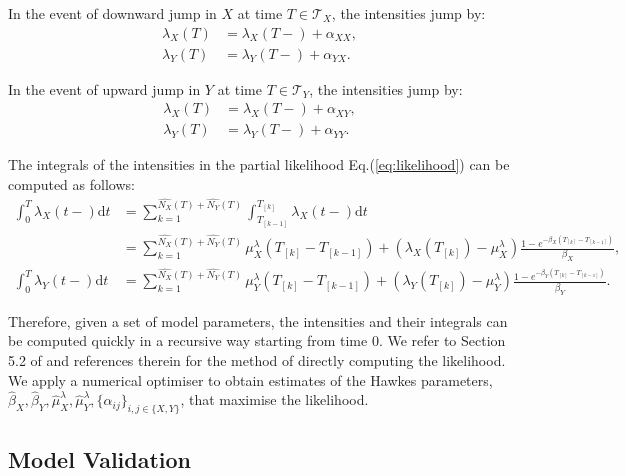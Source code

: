 \documentclass{article}
\newcommand{\diff}{\mathrm{d}}
\theoremstyle{definition}
\begin{document}
In the event of downward jump in $X$ at time $T \in \mathcal{T}_X$, the intensities jump by:
\begin{equation}
   \begin{split}
 \lambda_X(T) &= \lambda_X(T-) + \alpha_{XX},\\
 \lambda_Y(T) &= \lambda_Y(T-) + \alpha_{YX}.
   \end{split}
\end{equation}

In the event of upward jump in $Y$ at time $T \in \mathcal{T}_Y$, the intensities jump by:
\begin{equation}
   \begin{split}
 \lambda_X(T) &= \lambda_X(T-) + \alpha_{XY},\\
 \lambda_Y(T) &= \lambda_Y(T-) + \alpha_{YY}.
   \end{split}
\end{equation}

The integrals of the intensities in the partial likelihood Eq.(\ref{eq:likelihood}) can be computed as follows:
\begin{equation}
   \begin{split}
 \int_0^T\lambda_X(t-)\diff t &= \sum_{k=1}^{\widehat{N_X}(T) + \widehat{N_Y}(T)} \int_{T_{[k-1]}}^{T_{[k]}}\lambda_X(t-)\diff t\\
 &= \sum_{k=1}^{\widehat{N_X}(T) + \widehat{N_Y}(T)} 
\mu_X^\lambda(T_{[k]}-T_{[k-1]})
+\left(\lambda_X(T_{[k]})-\mu_X^\lambda\right)\frac{1-e^{-\beta_X(T_{[k]} - T_{[k-1]})}}{\beta_X},\\ 
\int_0^T\lambda_Y(t-)\diff t&= \sum_{k=1}^{\widehat{N_X}(T) + \widehat{N_Y}(T)} 
\mu_Y^\lambda(T_{[k]}-T_{[k-1]})
+\left(\lambda_Y(T_{[k]})-\mu_Y^\lambda\right)\frac{1-e^{-\beta_Y(T_{[k]} - T_{[k-1]})}}{\beta_Y}.
   \end{split}
\end{equation}

Therefore, given a set of model parameters, the intensities and their integrals can be computed quickly in a recursive way starting from time 0. We refer to Section 5.2 of \cite{laub2021elements} and references therein for the method of directly computing the likelihood.
We apply a numerical optimiser to obtain estimates of the Hawkes parameters, $\hat \beta_X, \hat \beta_Y, \hat \mu_X^\lambda, \hat \mu_Y^\lambda, \{\hat \alpha_{ij}\}_{i,j \in \{X,Y\}}$, that maximise the likelihood.

\subsection{Model Validation}
\end{document}
